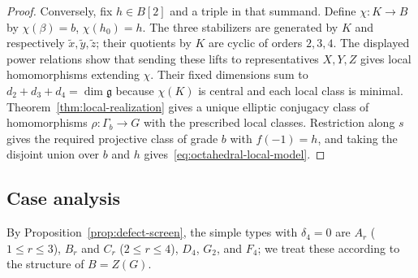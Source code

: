\documentclass[11pt,a4paper,reqno]{amsart}
\theoremstyle{plain}
\theoremstyle{definition}
\theoremstyle{remark}
\numberwithin{equation}{section}
\newcommand{\fg}{\mathfrak g}
\begin{document}
\begin{proof}
Conversely, fix $h\in B[2]$ and a triple in that summand. Define $\chi\colon K\to B$ by $\chi(\beta)=b$, $\chi(h_0)=h$. The three stabilizers are generated by $K$ and respectively $\widetilde x,\widetilde y,\widetilde z$; their quotients by $K$ are cyclic of orders $2,3,4$. The displayed power relations show that sending these lifts to representatives $X,Y,Z$ gives local homomorphisms extending $\chi$. Their fixed dimensions sum to $d_2+d_3+d_4=\dim\fg$ because $\chi(K)$ is central and each local class is minimal. Theorem~\ref{thm:local-realization} gives a unique elliptic conjugacy class of homomorphisms $\rho\colon\Gamma_b\to G$ with the prescribed local classes. Restriction along $s$ gives the required projective class of grade $b$ with $f(-1)=h$, and taking the disjoint union over $b$ and $h$ gives~\eqref{eq:octahedral-local-model}.
\end{proof}

\subsection{Case analysis}

By Proposition~\ref{prop:defect-screen}, the simple types with $\delta_4=0$ are $A_r$ ($1\le r\le 3$), $B_r$ and $C_r$ ($2\le r\le 4$), $D_4$, $G_2$, and $F_4$; we treat these according to the structure of $B=Z(G)$.
\end{document}

